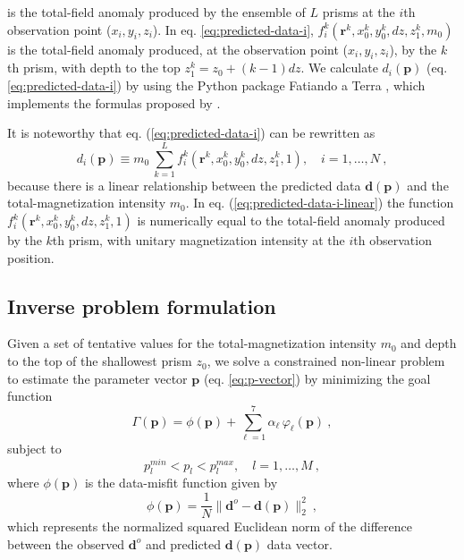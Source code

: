 is the total-field anomaly produced by the ensemble of $L$ prisms at the $i$th observation point ($x_{i}, y_{i}, z_{i}$). In eq. \ref{eq:predicted-data-i}, $f_{i}^{k}(\mathbf{r}^{k}, x_{0}^{k}, y_{0}^{k}, dz, z_{1}^{k}, m_{0})$ is the total-field anomaly produced, at the observation point ($x_{i}, y_{i}, z_{i}$), by the $k$th prism, with depth to the top $z_{1}^{k} = z_{0} + (k-1)dz$. We calculate $d_{i} (\mathbf{p})$ (eq. \ref{eq:predicted-data-i}) by using the Python package Fatiando a Terra \cite[]{uieda-etal2013}, which implements the formulas proposed by \cite{plouff1976}.

It is noteworthy that eq. (\ref{eq:predicted-data-i}) can be rewritten as 
\begin{equation}
d_{i} (\mathbf{p}) \equiv m_{0} \: \sum\limits_{k=1}^{L} f_{i}^{k}(\mathbf{r}^{k}, x_{0}^{k}, y_{0}^{k}, dz, z_{1}^{k}, 1), \quad i = 1, \dots, N \: ,
\label{eq:predicted-data-i-linear}
\end{equation}
because there is a linear relationship between the predicted data $\mathbf{d} (\mathbf{p})$
and the total-magnetization intensity $m_{0}$. 
In eq. (\ref{eq:predicted-data-i-linear}) the function 
$f_{i}^{k}(\mathbf{r}^{k}, x_{0}^{k}, y_{0}^{k}, dz, z_{1}^{k}, 1)$ is numerically equal to the total-field anomaly produced by the $k$th prism, with unitary magnetization intensity at the $i$th observation position. 


\subsection{Inverse problem formulation}

Given a set of tentative values for the total-magnetization intensity $m_{0}$ and 
depth to the top of the shallowest prism $z_{0}$, we solve a constrained non-linear 
problem to estimate the parameter vector $\mathbf{p}$ (eq. \ref{eq:p-vector}) 
by minimizing the goal function
\begin{equation}
\Gamma (\mathbf{p}) = \phi (\mathbf{p}) + \sum\limits^{7}_{\ell =1} \alpha_{\ell} \, \varphi_{\ell}(\mathbf{p}) \: ,
\label{eq:gamma}
\end{equation}
subject to
\begin{equation}
p_{l}^{min} < p_{l} < p_{l}^{max}, \quad l = 1, \dots, M \: ,
\label{eq:inequality-constraint}
\end{equation}
where $\phi (\mathbf{p})$ is the data-misfit function given by
\begin{equation}\label{eq:misfit}
\phi (\mathbf{p}) = \frac{1}{N} \| \mathbf{d}^{o} - \mathbf{d}(\mathbf{p}) \|_{2}^{2} \: ,
\end{equation}
which represents the normalized squared Euclidean norm of the difference between the 
observed $\mathbf{d}^{o}$ and predicted $\mathbf{d}(\mathbf{p})$ data vector.

